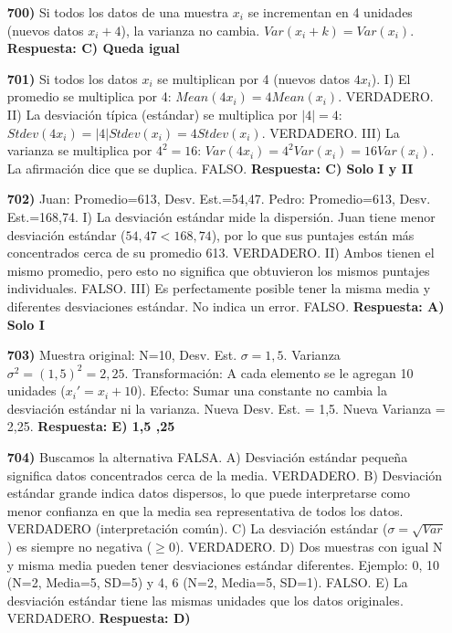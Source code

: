 \documentclass[12pt, a4paper]{article} %
\begin{document}
\begin{enumerate}
    \item[\bfseries 700)] Si todos los datos de una muestra $x_i$ se incrementan en 4 unidades (nuevos datos $x_i + 4$), la varianza no cambia. $Var(x_i + k) = Var(x_i)$.
    \textbf{Respuesta: C) Queda igual}

    \item[\bfseries 701)] Si todos los datos $x_i$ se multiplican por 4 (nuevos datos $4x_i$).
    I) El promedio se multiplica por 4: $Mean(4x_i) = 4 Mean(x_i)$. VERDADERO.
    II) La desviación típica (estándar) se multiplica por $|4|=4$: $Stdev(4x_i) = |4| Stdev(x_i) = 4 Stdev(x_i)$. VERDADERO.
    III) La varianza se multiplica por $4^2=16$: $Var(4x_i) = 4^2 Var(x_i) = 16 Var(x_i)$. La afirmación dice que se duplica. FALSO.
    \textbf{Respuesta: C) Solo I y II}

    \item[\bfseries 702)] Juan: Promedio=613, Desv. Est.=54,47. Pedro: Promedio=613, Desv. Est.=168,74.
    I) La desviación estándar mide la dispersión. Juan tiene menor desviación estándar ($54,47 < 168,74$), por lo que sus puntajes están más concentrados cerca de su promedio 613. VERDADERO.
    II) Ambos tienen el mismo promedio, pero esto no significa que obtuvieron los mismos puntajes individuales. FALSO.
    III) Es perfectamente posible tener la misma media y diferentes desviaciones estándar. No indica un error. FALSO.
    \textbf{Respuesta: A) Solo I}

    \item[\bfseries 703)] Muestra original: N=10, Desv. Est. $\sigma = 1,5$. Varianza $\sigma^2 = (1,5)^2 = 2,25$.
    Transformación: A cada elemento se le agregan 10 unidades ($x_i' = x_i + 10$).
    Efecto: Sumar una constante no cambia la desviación estándar ni la varianza.
    Nueva Desv. Est. = 1,5. Nueva Varianza = 2,25.
    \textbf{Respuesta: E) 1,5 ,25}

    \item[\bfseries 704)] Buscamos la alternativa FALSA.
    A) Desviación estándar pequeña significa datos concentrados cerca de la media. VERDADERO.
    B) Desviación estándar grande indica datos dispersos, lo que puede interpretarse como menor confianza en que la media sea representativa de todos los datos. VERDADERO (interpretación común).
    C) La desviación estándar ($\sigma = \sqrt{Var}$) es siempre no negativa ($\ge 0$). VERDADERO.
    D) Dos muestras con igual N y misma media pueden tener desviaciones estándar diferentes. Ejemplo: {0, 10} (N=2, Media=5, SD=5) y {4, 6} (N=2, Media=5, SD=1). FALSO. %
    E) La desviación estándar tiene las mismas unidades que los datos originales. VERDADERO.
    \textbf{Respuesta: D)}


\end{enumerate}
\end{document}
